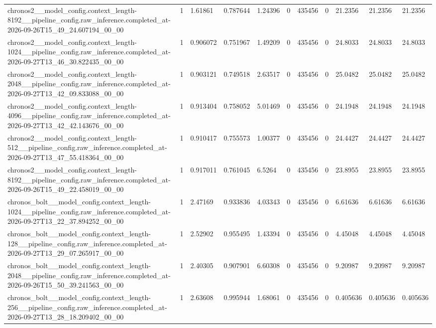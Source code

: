 \begin{tabular}{lllllllllll}
chronos2\_\_model\_config.context\_length-8192\_\_pipeline\_config.raw\_inference.completed\_at-2026-09-26T15\_49\_24.607194\_00\_00 & 1 & 1.61861 & 0.787644 & 1.24396 & 0 & 435456 & 0 & 21.2356 & 21.2356 & 21.2356 \\
chronos2\_\_model\_config.context\_length-1024\_\_pipeline\_config.raw\_inference.completed\_at-2026-09-27T13\_46\_30.822435\_00\_00 & 1 & 0.906072 & 0.751967 & 1.49209 & 0 & 435456 & 0 & 24.8033 & 24.8033 & 24.8033 \\
chronos2\_\_model\_config.context\_length-2048\_\_pipeline\_config.raw\_inference.completed\_at-2026-09-27T13\_42\_09.833088\_00\_00 & 1 & 0.903121 & 0.749518 & 2.63517 & 0 & 435456 & 0 & 25.0482 & 25.0482 & 25.0482 \\
chronos2\_\_model\_config.context\_length-4096\_\_pipeline\_config.raw\_inference.completed\_at-2026-09-27T13\_42\_42.143676\_00\_00 & 1 & 0.913404 & 0.758052 & 5.01469 & 0 & 435456 & 0 & 24.1948 & 24.1948 & 24.1948 \\
chronos2\_\_model\_config.context\_length-512\_\_pipeline\_config.raw\_inference.completed\_at-2026-09-27T13\_47\_55.418364\_00\_00 & 1 & 0.910417 & 0.755573 & 1.00377 & 0 & 435456 & 0 & 24.4427 & 24.4427 & 24.4427 \\
chronos2\_\_model\_config.context\_length-8192\_\_pipeline\_config.raw\_inference.completed\_at-2026-09-26T15\_49\_22.458019\_00\_00 & 1 & 0.917011 & 0.761045 & 6.5264 & 0 & 435456 & 0 & 23.8955 & 23.8955 & 23.8955 \\
chronos\_bolt\_\_model\_config.context\_length-1024\_\_pipeline\_config.raw\_inference.completed\_at-2026-09-27T13\_22\_37.894252\_00\_00 & 1 & 2.47169 & 0.933836 & 4.03343 & 0 & 435456 & 0 & 6.61636 & 6.61636 & 6.61636 \\
chronos\_bolt\_\_model\_config.context\_length-128\_\_pipeline\_config.raw\_inference.completed\_at-2026-09-27T13\_29\_07.265917\_00\_00 & 1 & 2.52902 & 0.955495 & 1.43394 & 0 & 435456 & 0 & 4.45048 & 4.45048 & 4.45048 \\
chronos\_bolt\_\_model\_config.context\_length-2048\_\_pipeline\_config.raw\_inference.completed\_at-2026-09-26T15\_50\_39.241563\_00\_00 & 1 & 2.40305 & 0.907901 & 6.60308 & 0 & 435456 & 0 & 9.20987 & 9.20987 & 9.20987 \\
chronos\_bolt\_\_model\_config.context\_length-256\_\_pipeline\_config.raw\_inference.completed\_at-2026-09-27T13\_28\_18.209402\_00\_00 & 1 & 2.63608 & 0.995944 & 1.68061 & 0 & 435456 & 0 & 0.405636 & 0.405636 & 0.405636 \\

\end{tabular}
